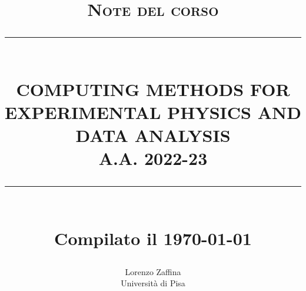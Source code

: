 \documentclass[10pt,a4paper,hidelinks]{book}
\newcommand{\HRule}[1]{\rule{\linewidth}{#1}}
\begin{document}
\title{ \normalsize \textsc{Note del corso}
		\\ [0.2cm]
		\HRule{0.5pt} \\
		\LARGE \textbf{\uppercase{Computing Methods for Experimental Physics and Data Analysis}\\ [0.2cm]
		A.A. 2022-23}
		\HRule{2pt} \\ [0.5cm]
		\normalsize Compilato il \today \vspace*{5\baselineskip}}

\date{}

\author{
		Lorenzo Zaffina \\  [0.8cm]
		Università di Pisa \\ }



\maketitle



\tableofcontents






\appendix


\end{document}
